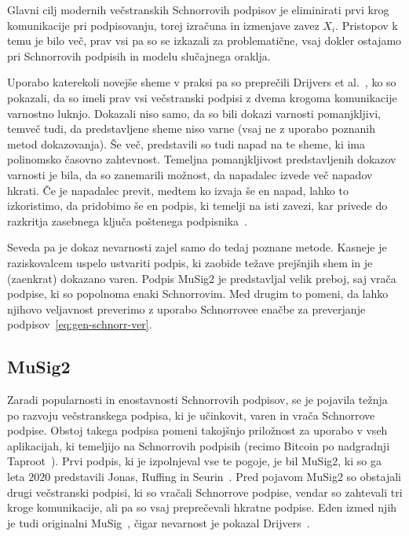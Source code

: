 Glavni cilj modernih večstranskih Schnorrovih podpisov je eliminirati prvi krog komunikacije
pri podpisovanju, torej izračuna in izmenjave zavez $X_i$. Pristopov k temu je bilo več, prav vsi
pa so se izkazali za problematične, vsaj dokler ostajamo pri Schnorrovih podpisih in modelu
slučajnega oraklja.

Uporabo katerekoli novejše sheme v praksi pa so preprečili Drijvers et al.~\cite{drijvers2019security},
ko so pokazali, da so imeli prav vsi večstranski podpisi z dvema krogoma komunikacije varnostno
luknjo. Dokazali niso samo, da so bili dokazi varnosti pomanjkljivi, temveč tudi, da predstavljene
sheme niso varne (vsaj ne z uporabo poznanih metod dokazovanja). Še več, predstavili so tudi napad
na te sheme, ki ima polinomsko časovno zahtevnost. Temeljna pomanjkljivost predstavljenih dokazov
varnosti je bila, da so zanemarili možnost, da napadalec izvede več napadov hkrati. Če je napadalec
previt, medtem ko izvaja še en napad, lahko to izkoristimo, da pridobimo še en podpis, ki temelji
na isti zavezi, kar privede do razkritja zasebnega ključa poštenega podpisnika~\cite{drijvers2019security}.

Seveda pa je dokaz nevarnosti zajel samo do tedaj poznane metode. Kasneje je raziskovalcem uspelo
ustvariti podpis, ki zaobide težave prejšnjih shem in je (zaenkrat) dokazano varen. Podpis MuSig2
je predstavljal velik preboj, saj vrača podpise, ki so popolnoma enaki Schnorrovim. Med drugim to
pomeni, da lahko njihovo veljavnost preverimo z uporabo Schnorrovee enačbe za preverjanje
podpisov~\eqref{eq:gen-schnorr-ver}.

\subsection{MuSig2}
\label{sec:musig2}
Zaradi popularnosti in enostavnosti Schnorrovih podpisov, se je pojavila težnja po razvoju večstranskega
podpisa, ki je učinkovit, varen in vrača Schnorrove podpise. Obstoj takega podpisa pomeni takojšnjo
priložnost za uporabo v vseh aplikacijah, ki temeljijo na Schnorrovih podpisih (recimo Bitcoin po
nadgradnji Taproot~\cite{wuille2020bip341}). Prvi podpis, ki je izpolnjeval vse te pogoje, je bil 
MuSig2, ki so ga leta $2020$ predstavili Jonas, Ruffing in Seurin~\cite{jonas2020musig2}. Pred pojavom
MuSig2 so obstajali drugi večstranski podpisi, ki so vračali Schnorrove podpise, vendar so zahtevali
tri kroge komunikacije, ali pa so vsaj preprečevali hkratne podpise. Eden izmed njih je tudi originalni
MuSig~\cite{maxwell2019musig}, čigar nevarnost je pokazal Drijvers~\cite{drijvers2019security}.

